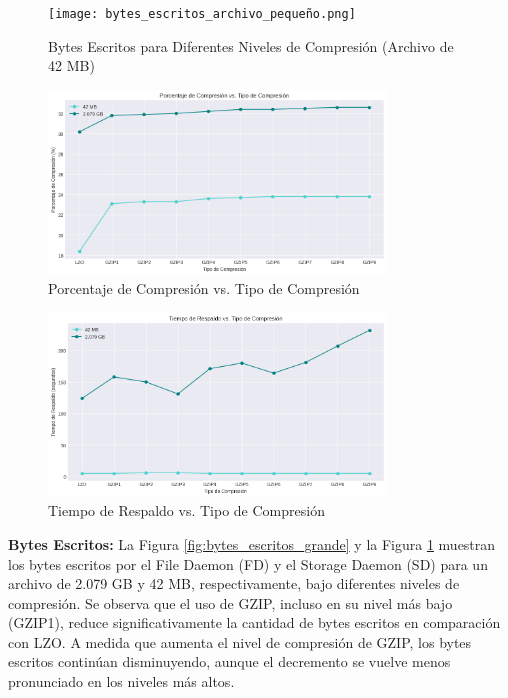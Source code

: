 \begin{figure}[H]
    \centering
    \texttt{[image: bytes\_escritos\_archivo\_pequeño.png]}
    \caption{Bytes Escritos para Diferentes Niveles de Compresión (Archivo de 42 MB)}
    \label{fig:bytes_escritos_pequeño}
\end{figure}

\begin{figure}[H]
    \centering
    \includegraphics[width=0.8\textwidth]{porcentaje_compresion.png}
    \caption{Porcentaje de Compresión vs. Tipo de Compresión}
    \label{fig:porcentaje_compresion}
\end{figure}

\begin{figure}[H]
    \centering
    \includegraphics[width=0.8\textwidth]{tiempo_respaldo.png}
    \caption{Tiempo de Respaldo vs. Tipo de Compresión}
    \label{fig:tiempo_respaldo}
\end{figure}

\textbf{Bytes Escritos:}
La Figura \ref{fig:bytes_escritos_grande} y la Figura \ref{fig:bytes_escritos_pequeño} muestran los bytes escritos por el File Daemon (FD) y el Storage Daemon (SD) para un archivo de 2.079 GB y 42 MB, respectivamente, bajo diferentes niveles de compresión. Se observa que el uso de GZIP, incluso en su nivel más bajo (GZIP1), reduce significativamente la cantidad de bytes escritos en comparación con LZO. A medida que aumenta el nivel de compresión de GZIP, los bytes escritos continúan disminuyendo, aunque el decremento se vuelve menos pronunciado en los niveles más altos.


